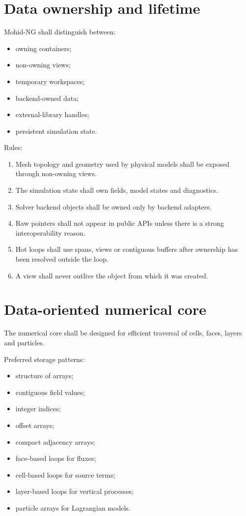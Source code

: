 \documentclass[11pt,a4paper]{article}
\begin{document}
\section{Data ownership and lifetime}

Mohid-NG shall distinguish between:

\begin{itemize}
  \item owning containers;
  \item non-owning views;
  \item temporary workspaces;
  \item backend-owned data;
  \item external-library handles;
  \item persistent simulation state.
\end{itemize}

Rules:

\begin{enumerate}
  \item Mesh topology and geometry used by physical models shall be exposed through non-owning views.
  \item The simulation state shall own fields, model states and diagnostics.
  \item Solver backend objects shall be owned only by backend adapters.
  \item Raw pointers shall not appear in public APIs unless there is a strong interoperability reason.
  \item Hot loops shall use spans, views or contiguous buffers after ownership has been resolved outside the loop.
  \item A view shall never outlive the object from which it was created.
\end{enumerate}

\section{Data-oriented numerical core}

The numerical core shall be designed for efficient traversal of cells, faces, layers and particles.

Preferred storage patterns:

\begin{itemize}
  \item structure of arrays;
  \item contiguous field values;
  \item integer indices;
  \item offset arrays;
  \item compact adjacency arrays;
  \item face-based loops for fluxes;
  \item cell-based loops for source terms;
  \item layer-based loops for vertical processes;
  \item particle arrays for Lagrangian models.
\end{itemize}
\end{document}
